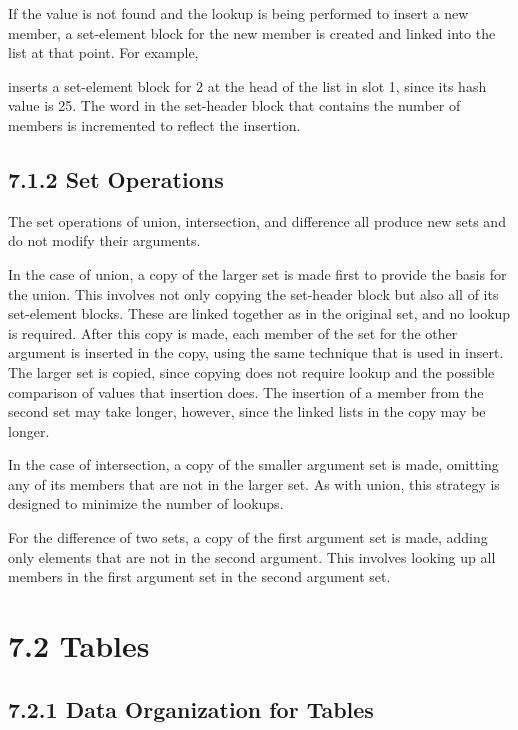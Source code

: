 If the value is not found and the lookup is being performed to insert
a new member, a set-element block for the new member is created and
linked into the list at that point. For example,


\noindent inserts a set-element block for 2 at the head of the list
in slot 1, since its hash value is 25. The word in the set-header
block that contains the number of members is incremented to reflect
the insertion.

\subsection[7.1.2 Set Operations]{7.1.2 Set Operations}

The set operations of union, intersection, and difference all produce
new sets and do not modify their arguments.


In the case of union, a copy of the larger set is made first to
provide the basis for the union. This involves not only copying the
set-header block but also all of its set-element blocks. These are
linked together as in the original set, and no lookup is
required. After this copy is made, each member of the set for the
other argument is inserted in the copy, using the same technique that
is used in insert. The larger set is copied, since copying does not
require lookup and the possible comparison of values that insertion
does. The insertion of a member from the second set may take longer,
however, since the linked lists in the copy may be longer.

In the case of intersection, a copy of the smaller argument set is
made, omitting any of its members that are not in the larger set. As
with union, this strategy is designed to minimize the number of
lookups.

For the difference of two sets, a copy of the first argument set is
made, adding only elements that are not in the second argument. This
involves looking up all members in the first argument set in the
second argument set.

\section[7.2 Tables]{7.2 Tables}
\subsection[7.2.1 Data Organization for Tables]{7.2.1 Data Organization for Tables}

